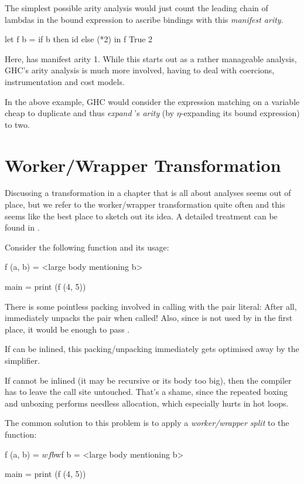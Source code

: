 The simplest possible arity analysis would just count the leading chain of lambdas in the bound expression to ascribe bindings with this \emph{manifest arity}.
\begin{haskellcode}
  let f b = 
        if b
        then id 
        else (*2)
  in f True 2
\end{haskellcode}

Here,  has manifest arity 1.
While this starts out as a rather manageable analysis, GHC's arity analysis is much more involved, having to deal with coercions, instrumentation and cost models.

In the above example, GHC would consider the  expression matching on a variable cheap to duplicate and thus \emph{expand} 's \emph{arity} (by $\eta$-expanding its bound expression) to two.

\section{Worker/Wrapper Transformation}\label{sec:ww}

Discussing a transformation in a chapter that is all about analyses seems out of place, but we refer to the worker/wrapper transformation quite often and this seems like the best place to sketch out its idea.
A detailed treatment can be found in \textcite{ww}.

Consider the following function and its usage:
\begin{haskellcode}
  f (a, b) = 
    <large body mentioning b>

  main = print (f (4, 5))
\end{haskellcode}

There is some pointless packing involved in calling  with the pair literal:
After all,  immediately unpacks the pair when called!
Also, since  is not used by  in the first place, it would be enough to pass .

If  can be inlined, this packing/unpacking immediately gets optimised away by the simplifier.

If  cannot be inlined (it may be recursive or its body too big), then the compiler has to leave the call site untouched.
That's a shame, since the repeated boxing and unboxing performs needless allocation, which especially hurts in hot loops.

The common solution to this problem is to apply a \emph{worker/wrapper split} to the function:
\begin{haskellcode}
  f (a, b) = 
    $wf b

  $wf b =
    <large body mentioning b>

  main = print (f (4, 5))
\end{haskellcode}


